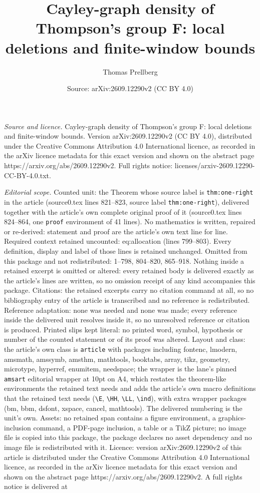 \documentclass[10pt,a4paper]{amsart}
\title[Cayley-graph density of Thompson's group F: local deletions ]{Cayley-graph density of Thompson's group F: local deletions and finite-window bounds}
\author{Thomas Prellberg}
\date{Source: arXiv:2609.12290v2 (CC BY 4.0)}
\begin{document}
\maketitle

\noindent\emph{Source and licence.} Cayley-graph density of Thompson's group F: local deletions and finite-window bounds. Version arXiv:2609.12290v2 (CC BY 4.0), distributed under the Creative Commons Attribution 4.0 International licence, as recorded in the arXiv licence metadata for this exact version and shown on the abstract page https://arxiv.org/abs/2609.12290v2. Full rights notice: licenses/arxiv-2609.12290-CC-BY-4.0.txt.\par\smallskip

\noindent\textit{Editorial scope.} Counted unit: the Theorem whose source label is \texttt{thm:one-right} in the article (source0.tex lines 821--823, source label \texttt{thm:one-right}), delivered together with the article's own complete original proof of it (source0.tex lines 824--864, one \texttt{proof} environment of 41 lines). No mathematics is written, repaired or re-derived: statement and proof are the article's own text line for line. Required context retained uncounted: eq:allocation (lines 799--803). Every definition, display and label of those lines is retained unchanged. Omitted from this package and not redistributed: 1--798, 804--820, 865--918. Nothing inside a retained excerpt is omitted or altered: every retained body is delivered exactly as the article's lines are written, so no omission receipt of any kind accompanies this package. Citations: the retained excerpts carry no citation command at all, so no bibliography entry of the article is transcribed and no reference is redistributed. Reference adaptation: none was needed and none was made; every reference inside the delivered unit resolves inside it, so no unresolved reference or citation is produced. Printed slips kept literal: no printed word, symbol, hypothesis or number of the counted statement or of its proof was altered. Layout and class: the article's own class is \texttt{article} with packages including fontenc, lmodern, amsmath, amssymb, amsthm, mathtools, booktabs, array, tikz, geometry, microtype, hyperref, enumitem, needspace; the wrapper is the lane's pinned \texttt{amsart} editorial wrapper at 10pt on A4, which restates the theorem-like environments the retained text needs and adds the article's own macro definitions that the retained text needs (\texttt{\textbackslash E}, \texttt{\textbackslash HH}, \texttt{\textbackslash LL}, \texttt{\textbackslash ind}), with extra wrapper packages (bm, bbm, dsfont, xspace, cancel, mathtools). The delivered numbering is the unit's own. Assets: no retained span contains a figure environment, a graphics-inclusion command, a PDF-page inclusion, a table or a TikZ picture; no image file is copied into this package, the package declares no asset dependency and no image file is redistributed with it. Licence: version arXiv:2609.12290v2 of this article is distributed under the Creative Commons Attribution 4.0 International licence, as recorded in the arXiv licence metadata for this exact version and shown on the abstract page https://arxiv.org/abs/2609.12290v2. A full rights notice is delivered at 
\end{document}
